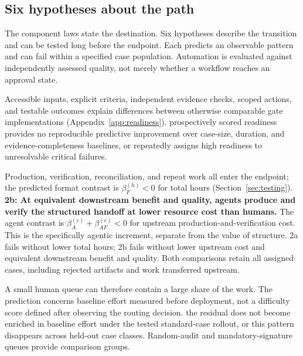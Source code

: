 \subsection{Six hypotheses about the path}
\label{sec:hypotheses}

The component laws state the destination. Six hypotheses describe the transition and can be tested
long before the endpoint. Each predicts an observable pattern and can fail within a specified case
population. Automation is evaluated against independently assessed quality, not merely whether a
workflow reaches an approval state.

 Accessible inputs, explicit criteria, independent evidence
checks, scoped actions, and testable outcomes explain differences between otherwise comparable gate
implementations (Appendix~\ref{app:readiness}).
 prospectively scored readiness provides no reproducible predictive
improvement over case-size, duration, and evidence-completeness baselines, or repeatedly assigns high
readiness to unresolvable critical failures.

 Production, verification, reconciliation, and repeat work all enter the
endpoint; the predicted format contrast is $\beta^{(h)}_{F}<0$ for total hours
(Section~\ref{sec:testing}). \textbf{2b: At equivalent downstream benefit and quality, agents produce
and verify the structured handoff at lower resource cost than humans.} The agent contrast is
$\beta^{(c)}_{A}+\beta^{(c)}_{AF}<0$ for upstream production-and-verification cost. This is the
specifically agentic increment, separate from the value of structure.
 2a fails without lower total hours; 2b fails without lower upstream cost
and equivalent downstream benefit and quality. Both comparisons retain all assigned cases, including
rejected artifacts and work transferred upstream.

 A small human queue
can therefore contain a large share of the work. The prediction concerns baseline effort measured
before deployment, not a difficulty score defined after observing the routing decision.
 the residual does not become enriched in baseline effort under the tested
standard-case rollout, or this pattern disappears across held-out case classes. Random-audit and
mandatory-signature queues provide comparison groups.

